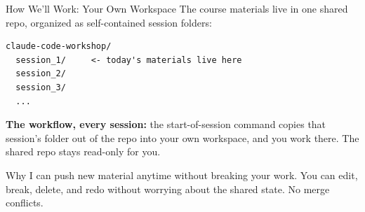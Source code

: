 \documentclass[aspectratio=169, 11pt]{beamer}
\begin{document}

\begin{frame}[fragile]{How We'll Work: Your Own Workspace}
  The course materials live in one shared repo, organized as self-contained session folders:

  \vspace{0.3em}
  \begin{lstlisting}[basicstyle=\ttfamily\footnotesize]
claude-code-workshop/
  session_1/     <- today's materials live here
  session_2/
  session_3/
  ...
  \end{lstlisting}

  \vspace{0.4em}
  \textbf{The workflow, every session:} the start-of-session command copies that session's folder out of the repo into your own workspace, and you work there. The shared repo stays read-only for you.

  \vspace{0.4em}
  \begin{block}{Why}
    I can push new material anytime without breaking your work. You can edit, break, delete, and redo without worrying about the shared state. No merge conflicts.
  \end{block}
\end{frame}
\end{document}
